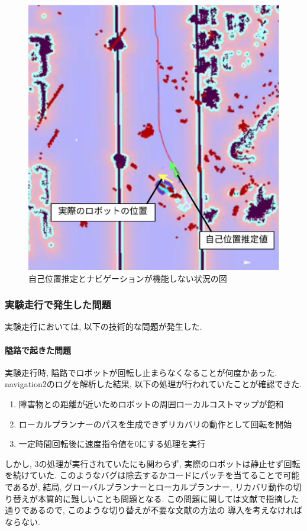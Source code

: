 \begin{figure}[h]
  \begin{center}
    \includegraphics[width=0.9\linewidth]{figs/kinako_result.eps}
    \caption{自己位置推定とナビゲーションが機能しない状況の図}
    \label{fig:kinako_result}
  \end{center}
\end{figure}



\subsubsection{実験走行で発生した問題}
実験走行においては, 以下の技術的な問題が発生した. 

\paragraph{隘路で起きた問題}
実験走行時, 隘路でロボットが回転し止まらなくなることが何度かあった. 
navigation2のログを解析した結果, 以下の処理が行われていたことが確認できた. 

\begin{enumerate}
  \item 障害物との距離が近いためロボットの周囲ローカルコストマップが飽和
  \item ローカルプランナーのパスを生成できずリカバリの動作として回転を開始
  \item  一定時間回転後に速度指令値を0にする処理を実行
\end{enumerate}
しかし, 3の処理が実行されていたにも関わらず, 
実際のロボットは静止せず回転を続けていた. 
このようなバグは除去するかコードにパッチを当てることで可能であるが, 
結局, グローバルプランナーとローカルプランナー, 
リカバリ動作の切り替えが本質的に難しいことも問題となる. 
この問題に関しては文献\cite{ueda2023JRM}で指摘した通りであるので, 
このような切り替えが不要な文献\cite{ueda2023JRM}の方法の
導入を考えなければならない. 

